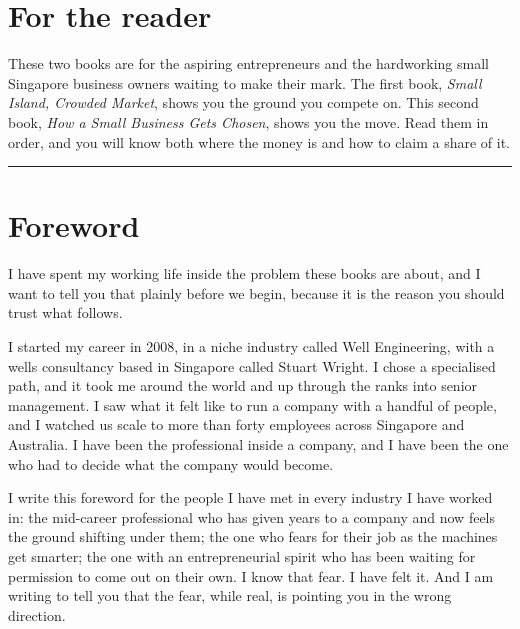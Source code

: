\documentclass[10pt,twoside,openany]{memoir}
\begin{document}
\frontmatter
\setcounter{tocdepth}{0}   %
\begingroup
{}
\tableofcontents*
\endgroup

\FloatBarrier
\chapter{For the reader}\label{for-the-reader}

These two books are for the aspiring entrepreneurs and the hardworking
small Singapore business owners waiting to make their mark. The first
book, \emph{Small Island, Crowded Market}, shows you the ground you
compete on. This second book, \emph{How a Small Business Gets Chosen},
shows you the move. Read them in order, and you will know both where the
money is and how to claim a share of it.

\begin{center}\rule{0.5\linewidth}{0.5pt}\end{center}

\FloatBarrier
\chapter{Foreword}\label{foreword}

I have spent my working life inside the problem these books are about,
and I want to tell you that plainly before we begin, because it is the
reason you should trust what follows.

I started my career in 2008, in a niche industry called Well
Engineering, with a wells consultancy based in Singapore called Stuart
Wright. I chose a specialised path, and it took me around the world and
up through the ranks into senior management. I saw what it felt like to
run a company with a handful of people, and I watched us scale to more
than forty employees across Singapore and Australia. I have been the
professional inside a company, and I have been the one who had to decide
what the company would become.

I write this foreword for the people I have met in every industry I have
worked in: the mid-career professional who has given years to a company
and now feels the ground shifting under them; the one who fears for
their job as the machines get smarter; the one with an entrepreneurial
spirit who has been waiting for permission to come out on their own. I
know that fear. I have felt it. And I am writing to tell you that the
fear, while real, is pointing you in the wrong direction.
\end{document}
